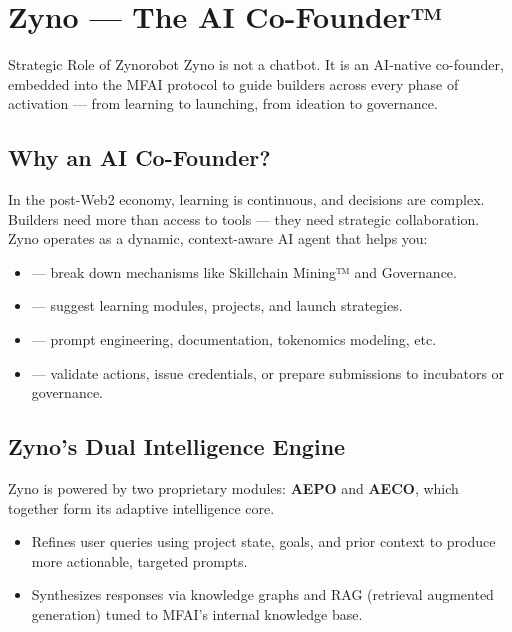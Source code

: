 \section{Zyno — The AI Co-Founder™}

\begin{mfai-box}{Strategic Role of Zyno}{robot}
Zyno is not a chatbot. It is an AI-native co-founder, embedded into the MFAI protocol to guide builders across every phase of activation — from learning to launching, from ideation to governance.
\end{mfai-box}

\vspace{1em}

\subsection*{Why an AI Co-Founder?}

In the post-Web2 economy, learning is continuous, and decisions are complex. Builders need more than access to tools — they need strategic collaboration. Zyno operates as a dynamic, context-aware AI agent that helps you:

\begin{itemize}
  \item {} — break down mechanisms like Skillchain Mining™ and Governance.
  \item {} — suggest learning modules, projects, and launch strategies.
  \item {} — prompt engineering, documentation, tokenomics modeling, etc.
  \item {} — validate actions, issue credentials, or prepare submissions to incubators or governance.
\end{itemize}

\vspace{1.5em}

\subsection*{Zyno’s Dual Intelligence Engine}

\begin{mfai-note}
Zyno is powered by two proprietary modules: \textbf{AEPO} and \textbf{AECO}, which together form its adaptive intelligence core.
\end{mfai-note}

\begin{itemize}
  \item {} Refines user queries using project state, goals, and prior context to produce more actionable, targeted prompts.
  \item {} Synthesizes responses via knowledge graphs and RAG (retrieval augmented generation) tuned to MFAI’s internal knowledge base.
\end{itemize}

